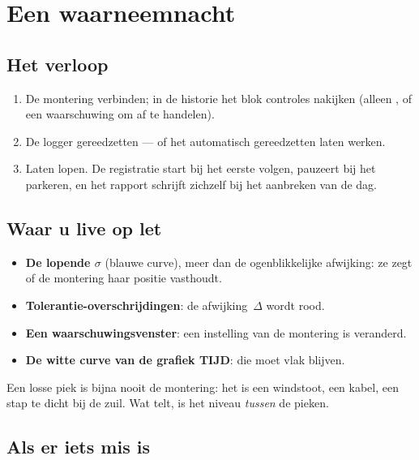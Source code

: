 \chapter{Een waarneemnacht}
\label{ch:night}

\section{Het verloop}

\begin{enumerate}
  \item De montering verbinden; in de historie het blok controles nakijken
  (alleen \checkmark, of een waarschuwing om af te handelen).
  \item De logger gereedzetten --- of het automatisch gereedzetten laten werken.
  \item Laten lopen. De registratie start bij het eerste volgen, pauzeert bij
  het parkeren, en het rapport schrijft zichzelf bij het aanbreken van de dag.
\end{enumerate}

\section{Waar u live op let}

\begin{itemize}
  \item \textbf{De lopende $\sigma$} (blauwe curve), meer dan de
  ogenblikkelijke afwijking: ze zegt of de montering haar positie vasthoudt.
  \item \textbf{Tolerantie-overschrijdingen}: de afwijking~$\Delta$ wordt rood.
  \item \textbf{Een waarschuwingsvenster}: een instelling van de montering is
  veranderd.
  \item \textbf{De witte curve van de grafiek TIJD}: die moet vlak blijven.
\end{itemize}

\begin{tip}
Een losse piek is bijna nooit de montering: het is een windstoot, een kabel, een
stap te dicht bij de zuil. Wat telt, is het niveau \emph{tussen} de pieken.
\end{tip}

\section{Als er iets mis is}

